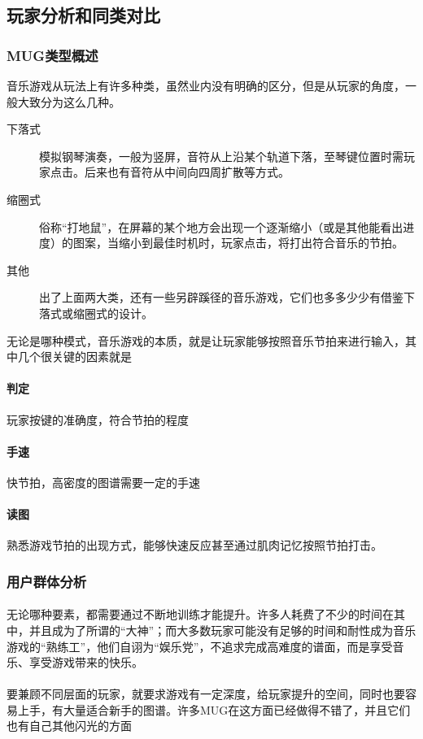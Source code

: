 \documentclass{article}
\begin{document}
\subsection{玩家分析和同类对比}
\subsubsection{MUG类型概述}
音乐游戏从玩法上有许多种类，虽然业内没有明确的区分，但是从玩家的角度，一般大致分为这么几种。
\begin{description}
  \item[下落式] 模拟钢琴演奏，一般为竖屏，音符从上沿某个轨道下落，至琴键位置时需玩家点击。后来也有音符从中间向四周扩散等方式。
  \item[缩圈式] 俗称“打地鼠”，在屏幕的某个地方会出现一个逐渐缩小（或是其他能看出进度）的图案，当缩小到最佳时机时，玩家点击，将打出符合音乐的节拍。
  \item[其他] 出了上面两大类，还有一些另辟蹊径的音乐游戏，它们也多多少少有借鉴下落式或缩圈式的设计。
\end{description}
无论是哪种模式，音乐游戏的本质，就是让玩家能够按照音乐节拍来进行输入，其中几个很关键的因素就是
\paragraph{判定}玩家按键的准确度，符合节拍的程度
\paragraph{手速}快节拍，高密度的图谱需要一定的手速
\paragraph{读图}熟悉游戏节拍的出现方式，能够快速反应甚至通过肌肉记忆按照节拍打击。\\
\subsubsection{用户群体分析}
\paragraph{}
无论哪种要素，都需要通过不断地训练才能提升。许多人耗费了不少的时间在其中，并且成为了所谓的“大神”；而大多数玩家可能没有足够的时间和耐性成为音乐游戏的“熟练工”，他们自诩为“娱乐党”，不追求完成高难度的谱面，而是享受音乐、享受游戏带来的快乐。
\paragraph{}
要兼顾不同层面的玩家，就要求游戏有一定深度，给玩家提升的空间，同时也要容易上手，有大量适合新手的图谱。许多MUG在这方面已经做得不错了，并且它们也有自己其他闪光的方面
\end{document}
